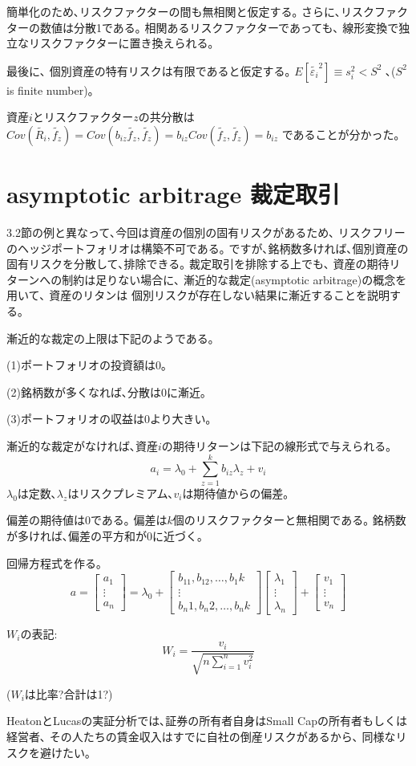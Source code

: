 \documentclass[uplatex,a4paper]{jsarticle}
\begin{document}
簡単化のため､リスクファクターの間も無相関と仮定する｡
さらに､リスクファクターの数値は分散1である｡
相関あるリスクファクターであっても､ 線形変換で独立なリスクファクターに置き換えられる｡

最後に､
個別資産の特有リスクは有限であると仮定する｡
$
E[\tilde{\varepsilon_i}^2] \equiv s_i^2 < S^2
$
､($ S^2 $ is finite number)｡

資産$i$とリスクファクター$z$の共分散は
$
Cov(\tilde{R_i},\tilde{f_z}) = Cov(b_{iz} \tilde{f_z}, \tilde{f_z}) = b_{iz} Cov(\tilde{f_z}, \tilde{f_z}) = b_{iz}
$
であることが分かった｡

\section{asymptotic arbitrage  裁定取引}

3.2節の例と異なって､今回は資産の個別の固有リスクがあるため､
リスクフリーのヘッジポートフォリオは構築不可である｡
ですが､銘柄数多ければ､個別資産の固有リスクを分散して､排除できる｡
裁定取引を排除する上でも､ 資産の期待リターンへの制約は足りない場合に､
漸近的な裁定(asymptotic arbitrage)の概念を用いて､
資産のリタンは 個別リスクが存在しない結果に漸近することを説明する｡


漸近的な裁定の上限は下記のようである｡

(1)ポートフォリオの投資額は0｡

(2)銘柄数が多くなれば､分散は0に漸近｡

(3)ポートフォリオの収益は0より大きい｡


漸近的な裁定がなければ､資産$i$の期待リターンは下記の線形式で与えられる｡
$$
a_i = \lambda_0 + \sum_{z=1}^{k} b_{iz} \lambda_z + v_i
$$
$\lambda_0$は定数､$\lambda_z$はリスクプレミアム､$v_i$は期待値からの偏差｡

偏差の期待値は0である｡
偏差は$k$個のリスクファクターと無相関である｡
銘柄数が多ければ､偏差の平方和が0に近づく｡

回帰方程式を作る｡
$$
a = \begin{bmatrix}
    a_1 \\
    \vdots \\
    a_n
    \end{bmatrix}
= \lambda_0 +
\begin{bmatrix}
    b_11, b_12, \hdots, b_1k \\
    \vdots \\
    b_n1, b_n2, \hdots, b_nk
\end{bmatrix}
\begin{bmatrix}
    \lambda_1 \\
    \vdots \\
    \lambda_n
\end{bmatrix}
+
\begin{bmatrix}
    v_1 \\
    \vdots \\
    v_n
\end{bmatrix}
$$

$W_i$の表記:
$$
W_i = \frac{v_i}{\sqrt{n \sum_{i=1}^{n} v_i^2}}
$$

($W_i$は比率?合計は1?)

HeatonとLucasの実証分析では､証券の所有者自身はSmall Capの所有者もしくは経営者､
その人たちの賃金収入はすでに自社の倒産リスクがあるから､
同様なリスクを避けたい｡
\end{document}
